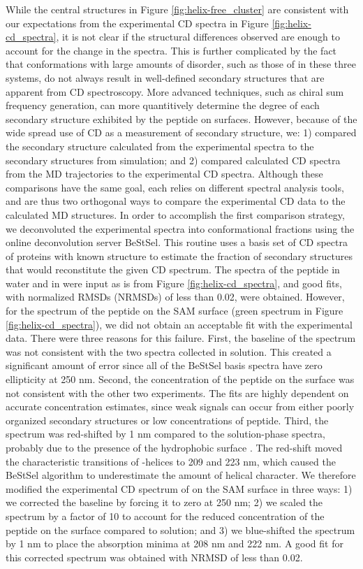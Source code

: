 While the central structures in Figure \ref{fig:helix-free_cluster} are consistent with our expectations from the experimental CD spectra in Figure \ref{fig:helix-cd_spectra}, it is not clear if the structural differences observed are enough to account for the change in the spectra. 
This is further complicated by the fact that conformations with large amounts of disorder, such as those of \pep{} in these three systems, do not always result in well-defined secondary structures that are apparent from CD spectroscopy. 
More advanced techniques, such as chiral sum frequency generation, can more quantitively determine the degree of each secondary structure exhibited by the peptide on surfaces\cite{Fu2011}. 
However, because of the wide spread use of CD as a measurement of secondary structure, we: 
1) compared the secondary structure calculated from the experimental spectra to the secondary structures from simulation; 
and 2) compared calculated CD spectra from the MD trajectories to the experimental CD spectra. 
Although these comparisons have the same goal, each relies on different spectral analysis tools, and are thus two orthogonal ways to compare the experimental CD data to the calculated MD structures. 
In order to accomplish the first comparison strategy, we deconvoluted the experimental spectra into conformational fractions using the online deconvolution server BeStSel\cite{Micsonai2015, Micsonai2018}. 
This routine uses a basis set of CD spectra of proteins with known structure to estimate the fraction of secondary structures that would reconstitute the given CD spectrum. 
The spectra of the peptide in water and in \tbawat{} were input as is from Figure \ref{fig:helix-cd_spectra}, and good fits, with normalized RMSDs (NRMSDs) of less than 0.02, were obtained. 
However, for the spectrum of the peptide on the SAM surface (green spectrum in Figure \ref{fig:helix-cd_spectra}), we did not obtain an acceptable fit with the experimental data.
There were three reasons for this failure. 
First, the baseline of the spectrum was not consistent with the two spectra collected in solution. 
This created a significant amount of error since all of the BeStSel basis spectra have zero ellipticity at 250 nm. 
Second, the concentration of the peptide on the surface was not consistent with the other two experiments. 
The fits are highly dependent on accurate concentration estimates, since weak signals can occur from either poorly organized secondary structures or low concentrations of peptide. 
Third, the spectrum was red-shifted by 1 nm compared to the solution-phase spectra, probably due to the presence of the hydrophobic surface \cite{Chen1997}. 
The red-shift moved the characteristic transitions of \textalpha{}-helices to 209 and 223 nm, which caused the BeStSel algorithm to underestimate the amount of helical character. 
We therefore modified the experimental CD spectrum of \pep{} on the SAM surface in three ways: 
1) we corrected the baseline by forcing it to zero at 250 nm; 
2) we scaled the spectrum by a factor of 10 to account for the reduced concentration of the peptide on the surface compared to solution; and 
3) we blue-shifted the spectrum by 1 nm to place the absorption minima at 208 nm and 222 nm. 
A good fit for this corrected spectrum was obtained with NRMSD of less than 0.02. 

